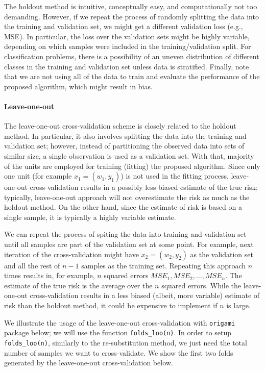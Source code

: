 \documentclass[12pt, krantz2,]{krantz}
\let\oldparagraph\paragraph
\renewcommand{\paragraph}[1]{\oldparagraph{#1}\mbox{}}
\theoremstyle{definition}
\theoremstyle{definition}
\theoremstyle{definition}
\newcommand{\1}{\mathbbm{1}}
\begin{document}
The holdout method is intuitive, conceptually easy, and computationally not too
demanding. However, if we repeat the process of randomly splitting the data into
the training and validation set, we might get a different validation loss (e.g.,
MSE). In particular, the loss over the validation sets might be highly
variable, depending on which samples were included in the training/validation
split. For classification problems, there is a possibility of an uneven
distribution of different classes in the training and validation set unless data
is stratified. Finally, note that we are not using all of the data to train and
evaluate the performance of the proposed algorithm, which might result in bias.

\hypertarget{leave-one-out}{%
\paragraph{Leave-one-out}\label{leave-one-out}}

The leave-one-out cross-validation scheme is closely related to the holdout
method. In particular, it also involves splitting the data into the training and
validation set; however, instead of partitioning the observed data into sets of
similar size, a single observation is used as a validation set. With that,
majority of the units are employed for training (fitting) the proposed
algorithm. Since only one unit (for example \(x_1 = (w_1, y_1)\)) is not used in
the fitting process, leave-one-out cross-validation results in a possibly less
biased estimate of the true risk; typically, leave-one-out approach will not
overestimate the risk as much as the holdout method. On the other hand, since
the estimate of risk is based on a single sample, it is typically a highly
variable estimate.

We can repeat the process of spiting the data into training and validation set
until all samples are part of the validation set at some point. For example,
next iteration of the cross-validation might have \(x_2 = (w_2,y_2)\) as the
validation set and all the rest of \(n-1\) samples as the training set. Repeating
this approach \(n\) times results in, for example, \(n\) squared errors \(MSE_1, MSE_2, \ldots, MSE_n\). The estimate of the true risk is the average over the
\(n\) squared errors. While the leave-one-out cross-validation results in a less
biased (albeit, more variable) estimate of risk than the holdout method, it
could be expensive to implement if \(n\) is large.

We illustrate the usage of the leave-one-out cross-validation with \texttt{origami}
package below; we will use the function \texttt{folds\_loo(n)}. In order to setup
\texttt{folds\_loo(n)}, similarly to the re-substitution method, we just need the total
number of samples we want to cross-validate. We show the first two folds
generated by the leave-one-out cross-validation below.
\end{document}
